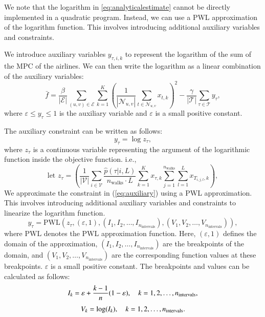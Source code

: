\documentclass[preprint,times]{elsarticle}
\def\mkhalil#1{{\color{black} #1}}
\begin{document}
We note that the logarithm in \mkhalil{\eqref{eq:analyticalestimate}} cannot be directly implemented in a quadratic program. Instead, we can use a \ac{PWL} approximation of the logarithm function. This involves introducing additional auxiliary variables and constraints.

We introduce auxiliary variables $y_{\tau,i,k}$ to represent the logarithm of the sum of the \ac{MPC} of the airlines. We can then write the logarithm as a linear combination of the auxiliary variables:
%
\begin{equation} \label{eq:finalobjaux}
\bar{f} = \dfrac{\beta}{\left|\mathcal{E}\right|}\sum_{(u,v)\in\mathcal{E}}\sum_{k=1}^{K} \left( \frac{1}{|\mathcal{N}_{u,v}|} \sum_{t \in \mathcal{N}_{u,v}} x_{t, k} \right)^2 - \dfrac{\gamma}{\left|\mathcal{T}\right|}\sum_{\tau\in\mathcal{T}}y_{\tau},
\end{equation}
%
where $\varepsilon \leq y_{\tau} \leq 1$ is the auxiliary variable and $\varepsilon$ is a small positive constant.

The auxiliary constraint can be written as follows:
%
\begin{equation} \label{eq:auxiliary}
y_{\tau} = \log{z_{\tau}},
\end{equation}
%
where $z_{\tau}$ is a continuous variable representing the argument of the logarithmic function inside the objective function. i.e.,
%
\[
\text{let } z_{\tau} = \left(\dfrac{1}{\left|\mathcal{V}\right|}\sum_{i\in\mathcal{V}}\dfrac{\hat{p}(\tau|i,L)}{n_\text{walks}\cdot L}\sum_{k=1}^{K}x_{\tau,k}\sum_{j=1}^{n_\text{walks}}\sum_{l=1}^{L}x_{T_{i,j,l},k}\right),
\]
%
We approximate the constraint in (\ref{eq:auxiliary}) using a \ac{PWL} approximation. This involves introducing additional auxiliary variables and constraints to linearize the logarithm function.
%
\begin{equation} \label{eq:pwlapprox}
y_{\tau} = \text{PWL}(z_{\tau}, (\varepsilon, 1), (I_1, I_2, \ldots, I_{n_\text{intervals}}), (V_1, V_2, \ldots, V_{n_\text{intervals}})),
\end{equation}
%
where $\text{PWL}$ denotes the \ac{PWL} approximation function. Here, $(\varepsilon, 1)$ defines the domain of the approximation, $(I_1, I_2, \ldots, I_{n_\text{intervals}})$ are the breakpoints of the domain, and $(V_1, V_2, \ldots, V_{n_\text{intervals}})$ are the corresponding function values at these breakpoints. $\varepsilon$ is a small positive constant. The breakpoints and values can be calculated as follows:
%
\begin{equation} \label{eq:breakpoints}
    I_k = \varepsilon + \frac{\mkhalil{k-1}}{n}(1-\varepsilon), \quad \mkhalil{k=1,2,\ldots,n_\text{intervals}},
\end{equation}
%
\begin{equation} \label{eq:values}
    V_k = \log(I_k), \quad \mkhalil{k=1,2,\ldots,n_\text{intervals}}.
\end{equation}
\end{document}
